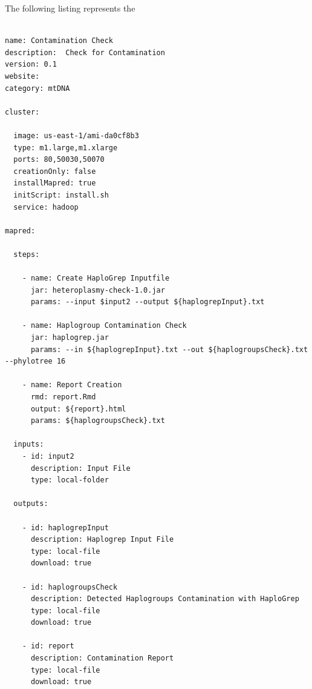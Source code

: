 The following listing represents the  
\newpage
\begin{lstlisting}[caption={Cloudgene YAML file, defining the HaploChecker Workflow}, label=appyaml]

name: Contamination Check
description:  Check for Contamination
version: 0.1
website: 
category: mtDNA

cluster:

  image: us-east-1/ami-da0cf8b3
  type: m1.large,m1.xlarge
  ports: 80,50030,50070
  creationOnly: false
  installMapred: true
  initScript: install.sh
  service: hadoop
 
mapred:

  steps:
 
    - name: Create HaploGrep Inputfile
      jar: heteroplasmy-check-1.0.jar
      params: --input $input2 --output ${haplogrepInput}.txt

    - name: Haplogroup Contamination Check
      jar: haplogrep.jar
      params: --in ${haplogrepInput}.txt --out ${haplogroupsCheck}.txt --phylotree 16

    - name: Report Creation
      rmd: report.Rmd
      output: ${report}.html
      params: ${haplogroupsCheck}.txt

  inputs:
    - id: input2
      description: Input File
      type: local-folder

  outputs:

    - id: haplogrepInput
      description: Haplogrep Input File
      type: local-file
      download: true

    - id: haplogroupsCheck
      description: Detected Haplogroups Contamination with HaploGrep
      type: local-file
      download: true

    - id: report
      description: Contamination Report
      type: local-file
      download: true 
\end{lstlisting}